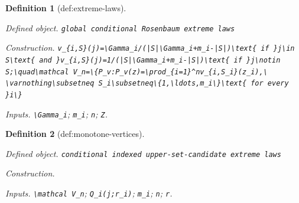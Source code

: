 \documentclass{article}
\newtheorem{definition}{Definition}
\begin{document}
\begin{definition}[def:extreme-laws]\label{def:extreme-laws}
\par\smallskip\noindent\emph{Defined object.} \texttt{global conditional Rosenbaum extreme laws}
\par\smallskip\noindent\emph{Construction.} \texttt{v\_\allowbreak{}\{i,\allowbreak{}S\}\allowbreak{}(j)=\allowbreak{}\textbackslash{}\allowbreak{}Gamma\_\allowbreak{}i/\allowbreak{}(|S|\textbackslash{}\allowbreak{}Gamma\_\allowbreak{}i+\allowbreak{}m\_\allowbreak{}i-\allowbreak{}|S|)\textbackslash{}\allowbreak{}text\{ if \}\allowbreak{}j\textbackslash{}\allowbreak{}in S\textbackslash{}\allowbreak{}text\{ and \}\allowbreak{}v\_\allowbreak{}\{i,\allowbreak{}S\}\allowbreak{}(j)=\allowbreak{}1/\allowbreak{}(|S|\textbackslash{}\allowbreak{}Gamma\_\allowbreak{}i+\allowbreak{}m\_\allowbreak{}i-\allowbreak{}|S|)\textbackslash{}\allowbreak{}text\{ if \}\allowbreak{}j\textbackslash{}\allowbreak{}notin S;\allowbreak{}\textbackslash{}\allowbreak{}quad\textbackslash{}\allowbreak{}mathcal V\_\allowbreak{}n=\allowbreak{}\textbackslash{}\allowbreak{}\{P\_\allowbreak{}v:\allowbreak{}P\_\allowbreak{}v(z)=\allowbreak{}\textbackslash{}\allowbreak{}prod\_\allowbreak{}\{i=\allowbreak{}1\}\allowbreak{}\textasciicircum{}nv\_\allowbreak{}\{i,\allowbreak{}S\_\allowbreak{}i\}\allowbreak{}(z\_\allowbreak{}i),\allowbreak{}\textbackslash{}\allowbreak{} \textbackslash{}\allowbreak{}varnothing\textbackslash{}\allowbreak{}subsetneq S\_\allowbreak{}i\textbackslash{}\allowbreak{}subsetneq\textbackslash{}\allowbreak{}\{1,\allowbreak{}\textbackslash{}\allowbreak{}ldots,\allowbreak{}m\_\allowbreak{}i\textbackslash{}\allowbreak{}\}\allowbreak{}\textbackslash{}\allowbreak{}text\{ for every \}\allowbreak{}i\textbackslash{}\allowbreak{}\}\allowbreak{}}
\par\smallskip\noindent\emph{Inputs.} \texttt{\textbackslash{}\allowbreak{}Gamma\_\allowbreak{}i}; \texttt{m\_\allowbreak{}i}; \texttt{n}; \texttt{Z}.
\end{definition}

\begin{definition}[def:monotone-vertices]\label{def:monotone-vertices}
\par\smallskip\noindent\emph{Defined object.} \texttt{conditional indexed upper-\allowbreak{}set-\allowbreak{}candidate extreme laws}
\par\smallskip\noindent\emph{Construction.} \par\noindent {}\par\noindent
\par\smallskip\noindent\emph{Inputs.} \texttt{\textbackslash{}\allowbreak{}mathcal V\_\allowbreak{}n}; \texttt{Q\_\allowbreak{}i(j;\allowbreak{}r\_\allowbreak{}i)}; \texttt{m\_\allowbreak{}i}; \texttt{n}; \texttt{r}.
\end{definition}
\end{document}
